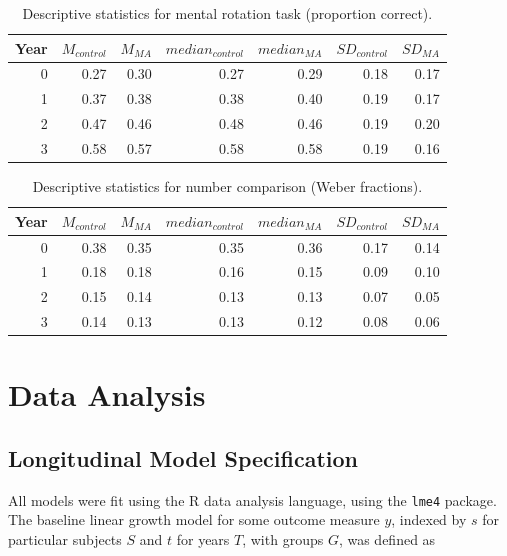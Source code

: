 \documentclass[11pt]{article}
\begin{document}
\begin{table}[H]
\centering
\begin{tabular}{rrrrrrr}
  \hline
Year & $M_{control}$ & $M_{MA}$ & $median_{control}$ & $median_{MA}$ & $SD_{control}$ & $SD_{MA}$ \\
  \hline
  0 & 0.27 & 0.30 & 0.27 & 0.29 & 0.18 & 0.17 \\
    1 & 0.37 & 0.38 & 0.38 & 0.40 & 0.19 & 0.17 \\
    2 & 0.47 & 0.46 & 0.48 & 0.46 & 0.19 & 0.20 \\
    3 & 0.58 & 0.57 & 0.58 & 0.58 & 0.19 & 0.16 \\
   \hline
\end{tabular}
\caption{Descriptive statistics for mental rotation task (proportion correct).}
\label{tab:mental.rot}
\end{table}
\begin{table}[H]
\centering
\begin{tabular}{rrrrrrr}
  \hline
Year & $M_{control}$ & $M_{MA}$ & $median_{control}$ & $median_{MA}$ & $SD_{control}$ & $SD_{MA}$ \\
  \hline
  0 & 0.38 & 0.35 & 0.35 & 0.36 & 0.17 & 0.14 \\
    1 & 0.18 & 0.18 & 0.16 & 0.15 & 0.09 & 0.10 \\
    2 & 0.15 & 0.14 & 0.13 & 0.13 & 0.07 & 0.05 \\
    3 & 0.14 & 0.13 & 0.13 & 0.12 & 0.08 & 0.06 \\
   \hline
\end{tabular}
\caption{Descriptive statistics for number comparison (Weber fractions).}
\label{tab:ans}
\end{table}


\section{Data Analysis}

\subsection{Longitudinal Model Specification}

All models were fit using the R data analysis language, using the \texttt{lme4} package. The baseline linear growth model for some outcome measure $y$, indexed by $s$ for particular subjects $S$ and $t$ for years $T$, with groups $G$, was defined as
\end{document}
